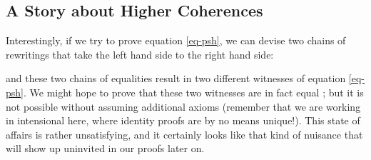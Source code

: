 \subsection{A Story about Higher Coherences}

Interestingly, if we try to prove equation \ref{eq-psh}, we can devise two
chains of rewritings that take the left hand side to the right hand
side:

\begin{center}
\end{center}

and these two chains of equalities result in two different witnesses of equation \ref{eq-psh}.
% 
We might hope to prove that these two witnesses are in fact equal ; but it is 
not possible without assuming additional axioms (remember that we are 
working in intensional \MLTT here, where identity proofs are by no means 
unique!).
% 
This state of affairs is rather unsatisfying, and it certainly looks like that 
kind of nuisance that will show up uninvited in our proofs later on.

